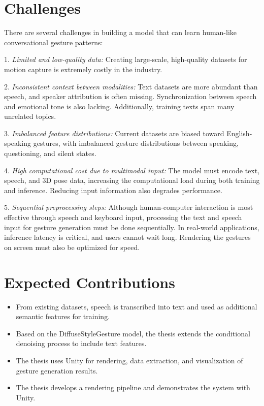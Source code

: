 \section{Challenges}
\label{sec:difficult}

There are several challenges in building a model that can learn human-like conversational gesture patterns:

1. \textit{Limited and low-quality data:} Creating large-scale, high-quality datasets for motion capture is extremely costly in the industry.

2. \textit{Inconsistent context between modalities:} Text datasets are more abundant than speech, and speaker attribution is often missing. Synchronization between speech and emotional tone is also lacking. Additionally, training texts span many unrelated topics.

3. \textit{Imbalanced feature distributions:} Current datasets are biased toward English-speaking gestures, with imbalanced gesture distributions between speaking, questioning, and silent states.

4. \textit{High computational cost due to multimodal input:} The model must encode text, speech, and 3D pose data, increasing the computational load during both training and inference. Reducing input information also degrades performance.

5. \textit{Sequential preprocessing steps:} Although human-computer interaction is most effective through speech and keyboard input, processing the text and speech input for gesture generation must be done sequentially. In real-world applications, inference latency is critical, and users cannot wait long. Rendering the gestures on screen must also be optimized for speed.

\section{Expected Contributions}

\begin{itemize}
	\item From existing datasets, speech is transcribed into text and used as additional semantic features for training.
	
	\item Based on the DiffuseStyleGesture model, the thesis extends the conditional denoising process to include text features.
	
	\item The thesis uses Unity for rendering, data extraction, and visualization of gesture generation results.
	
	\item The thesis develops a rendering pipeline and demonstrates the system with Unity.
\end{itemize}

